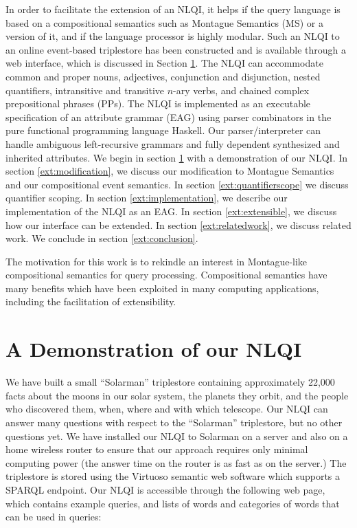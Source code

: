 \documentclass[../main.tex]{subfiles}
\begin{document}
\begin{refsection}
In order to facilitate the extension of an NLQI, it helps if the query language is based on a compositional
semantics such as Montague Semantics (MS) \cite{Dowty:wall} or a version of it, and if the language processor is highly
modular. Such an NLQI to an online event-based triplestore has been constructed and is available
through a web interface, which is discussed in Section \ref{ext:demonstration}. The NLQI can accommodate common and
proper nouns, adjectives, conjunction and disjunction, nested quantifiers, intransitive and transitive $n$-ary verbs, and chained complex prepositional phrases (PPs). The NLQI is implemented as an executable
specification of an attribute grammar (EAG) using parser combinators in the pure functional programming
language Haskell.
Our parser/interpreter can handle ambiguous left-recursive grammars and fully dependent synthesized
and inherited attributes.
We begin in section \ref{ext:demonstration} with a demonstration of our NLQI. In section \ref{ext:modification}, we discuss our modification to
Montague Semantics and our compositional event semantics. In section \ref{ext:quantifierscope} we discuss quantifier scoping. In section \ref{ext:implementation}, we describe our implementation
of the NLQI as an EAG. In section \ref{ext:extensible}, we discuss how our interface can be extended. In section \ref{ext:relatedwork}, we discuss related work. We conclude in section \ref{ext:conclusion}.

The motivation for this work is to rekindle an interest in Montague-like compositional semantics for query processing. Compositional semantics have many benefits which have been exploited in many computing applications, including the facilitation of extensibility.

\section{A Demonstration of our NLQI}
\label{ext:demonstration}
We have built a small ``Solarman'' triplestore containing approximately 22,000 facts about the moons in
our solar system, the planets they orbit, and the people who discovered them, when, where and with
which telescope. Our NLQI can answer many questions with respect to the ``Solarman'' triplestore, but no other questions yet. We
have installed our NLQI to Solarman on a server and also on a home wireless router to ensure that our
approach requires only minimal computing power (the answer time on the router is as fast as on the
server.) The triplestore is stored using the Virtuoso semantic web software which supports a SPARQL
endpoint. Our NLQI is accessible through the following web page, which contains example queries, and
lists of words and categories of words that can be used in queries:


\end{refsection}
\end{document}
